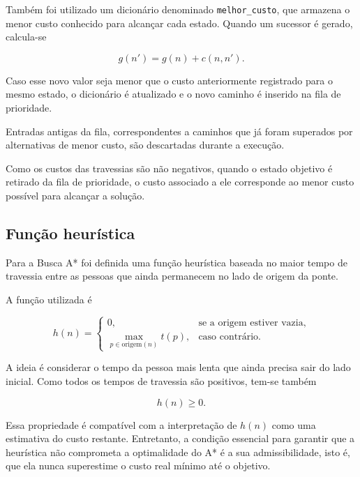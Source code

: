 Também foi utilizado um dicionário denominado \texttt{melhor\_custo}, que
armazena o menor custo conhecido para alcançar cada estado. Quando um sucessor
é gerado, calcula-se

\begin{equation}
	g(n') = g(n) + c(n,n').
\end{equation}

Caso esse novo valor seja menor que o custo anteriormente registrado para o
mesmo estado, o dicionário é atualizado e o novo caminho é inserido na fila de
prioridade.

Entradas antigas da fila, correspondentes a caminhos que já foram superados
por alternativas de menor custo, são descartadas durante a execução.

Como os custos das travessias são não negativos, quando o estado objetivo é
retirado da fila de prioridade, o custo associado a ele corresponde ao menor
custo possível para alcançar a solução.

\subsection{Função heurística}

Para a Busca A* foi definida uma função heurística baseada no maior tempo de
travessia entre as pessoas que ainda permanecem no lado de origem da ponte.

A função utilizada é

\begin{equation}
	h(n)=
	\begin{cases}
		0, & \text{se a origem estiver vazia}, \\[2mm]
		\displaystyle\max_{p\in \mathrm{origem}(n)} t(p),
		   & \text{caso contrário}.
	\end{cases}
\end{equation}

A ideia é considerar o tempo da pessoa mais lenta que ainda precisa sair do
lado inicial. Como todos os tempos de travessia são positivos, tem-se também

\begin{equation}
	h(n)\geq 0.
\end{equation}

Essa propriedade é compatível com a interpretação de $h(n)$ como uma
estimativa do custo restante. Entretanto, a condição essencial para garantir
que a heurística não comprometa a optimalidade do A* é a sua admissibilidade,
isto é, que ela nunca superestime o custo real mínimo até o objetivo.

